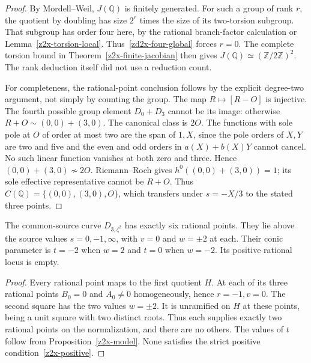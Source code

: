 \begin{proof}
By Mordell--Weil, \(J(\mathbb Q)\) is finitely generated.
For such a group of rank \(r\), the quotient by doubling
has size \(2^r\) times the size of its two-torsion subgroup.
That subgroup has order four here, by the rational
branch-factor calculation or Lemma~\ref{z2x-torsion-local}.
Thus~\eqref{zd2x-four-global} forces \(r=0\).
The complete torsion bound in
Theorem~\ref{z2x-finite-jacobian} then gives
\(J(\mathbb Q)\simeq(\mathbb Z/2\mathbb Z)^2\).
The rank deduction itself did not use a reduction count.

For completeness, the rational-point conclusion follows
by the explicit degree-two argument, not simply by
counting the group. The map \(R\mapsto[R-O]\) is injective.
The fourth possible group element \(D_0+D_3\) cannot be
its image: otherwise \(R+O\sim(0,0)+(3,0)\).
The canonical class is \(2O\). The functions with sole
pole at \(O\) of order at most two are the span of \(1,X\),
since the pole orders of \(X,Y\) are two and five and the
even and odd orders in \(a(X)+b(X)Y\) cannot cancel.
No such linear function vanishes at both zero and three.
Hence \((0,0)+(3,0)\not\sim2O\).
Riemann--Roch gives \(h^0((0,0)+(3,0))=1\);
its sole effective representative cannot be \(R+O\).
Thus \(C(\mathbb Q)=\{(0,0),(3,0),O\}\), which transfers
under \(s=-X/3\) to the stated three points.
\end{proof}

\begin{corollary}
\label{zd2x-six-boundary}
The common-source curve \(D_{3,\zeta^2}\) has exactly six
rational points. They lie above the source values
\(s=0,-1,\infty\), with \(v=0\) and \(w=\pm2\) at each.
Their conic parameter is \(t=-2\) when \(w=2\) and \(t=0\)
when \(w=-2\). Its positive rational locus is empty.
\end{corollary}
\begin{proof}
Every rational point maps to the first quotient \(H\).
At each of its three rational points \(B_0=0\) and
\(A_0\ne0\) homogeneously, hence \(r=-1,v=0\).
The second square has the two values \(w=\pm2\).
It is unramified on \(H\) at these points, being a unit
square with two distinct roots. Thus each supplies
exactly two rational points on the normalization, and
there are no others. The values of \(t\) follow from
Proposition~\ref{z2x-model}. None satisfies the strict
positive condition~\eqref{z2x-positive}.
\end{proof}

